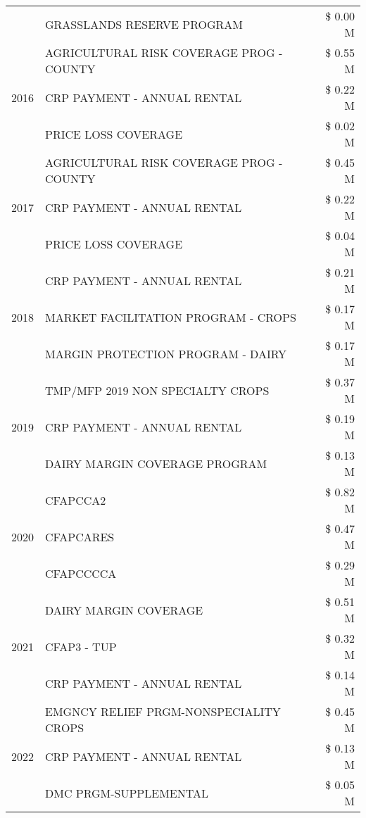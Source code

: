 \begin{tabular}{llr}
 & GRASSLANDS RESERVE PROGRAM & \$ 0.00 M \\
\cline{1-3}
\multirow[t]{3}{*}{2016} & AGRICULTURAL RISK COVERAGE PROG - COUNTY & \$ 0.55 M \\
 & CRP PAYMENT - ANNUAL RENTAL & \$ 0.22 M \\
 & PRICE LOSS COVERAGE & \$ 0.02 M \\
\cline{1-3}
\multirow[t]{3}{*}{2017} & AGRICULTURAL RISK COVERAGE PROG - COUNTY & \$ 0.45 M \\
 & CRP PAYMENT - ANNUAL RENTAL & \$ 0.22 M \\
 & PRICE LOSS COVERAGE & \$ 0.04 M \\
\cline{1-3}
\multirow[t]{3}{*}{2018} & CRP PAYMENT - ANNUAL RENTAL & \$ 0.21 M \\
 & MARKET FACILITATION PROGRAM - CROPS & \$ 0.17 M \\
 & MARGIN PROTECTION PROGRAM - DAIRY & \$ 0.17 M \\
\cline{1-3}
\multirow[t]{3}{*}{2019} & TMP/MFP 2019 NON SPECIALTY CROPS & \$ 0.37 M \\
 & CRP PAYMENT - ANNUAL RENTAL & \$ 0.19 M \\
 & DAIRY MARGIN COVERAGE PROGRAM & \$ 0.13 M \\
\cline{1-3}
\multirow[t]{3}{*}{2020} & CFAPCCA2 & \$ 0.82 M \\
 & CFAPCARES & \$ 0.47 M \\
 & CFAPCCCCA & \$ 0.29 M \\
\cline{1-3}
\multirow[t]{3}{*}{2021} & DAIRY MARGIN COVERAGE & \$ 0.51 M \\
 & CFAP3 - TUP & \$ 0.32 M \\
 & CRP PAYMENT - ANNUAL RENTAL & \$ 0.14 M \\
\cline{1-3}
\multirow[t]{3}{*}{2022} & EMGNCY RELIEF PRGM-NONSPECIALITY CROPS & \$ 0.45 M \\
 & CRP PAYMENT - ANNUAL RENTAL & \$ 0.13 M \\
 & DMC PRGM-SUPPLEMENTAL & \$ 0.05 M \\
\cline{1-3}
\bottomrule
\end{tabular}
